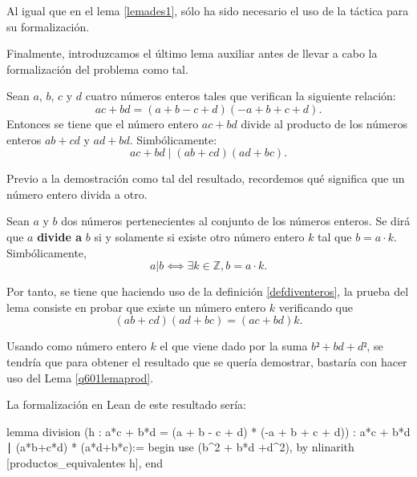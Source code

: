 Al igual que en el lema \ref{lemades1}, sólo ha sido necesario el uso de
la táctica  para su formalización.

Finalmente, introduzcamos el último lema auxiliar antes de llevar a cabo la
formalización del problema como tal.

\begin{lema}[division]\label{lemadivisionq6}
  Sean \(a\), \(b\), \(c\) y \(d\) cuatro números enteros tales que
  verifican la siguiente relación:
    \begin{equation}\tag{h}
      ac+bd = (a+b-c+d)(-a+b+c+d).
    \end{equation}
    Entonces se tiene que el número entero \(ac+bd\) divide al producto de
    los números enteros \(ab+cd\) y \(ad+bd\). Simbólicamente:
    \begin{equation}
      ac+bd ∣ (ab+cd)(ad+bc).
    \end{equation}
\end{lema}

\begin{demostracion}
  Previo a la demostración como tal del resultado, recordemos qué significa que
  un número entero divida a otro.
  \begin{definicion}\label{defdiventeros}
    Sean \(a\) y \(b\) dos números pertenecientes al conjunto de los números
    enteros. Se dirá que  \(a\) \textbf{divide a} \(b\) si y
    solamente si existe otro número entero \(k\) tal que \(b = a · k\).
    Simbólicamente,
    \begin{equation}
    a|b ⟺ ∃ k ∈ ℤ, b = a · k.
    \end{equation}
  \end{definicion}

  Por tanto, se tiene que haciendo uso de la definición \ref{defdiventeros},
  la prueba del lema consiste en probar que existe un número entero \(k\)
  verificando que
  \begin{equation}
    (ab+cd)(ad+bc)=(ac+bd)k.
  \end{equation}
  
  Usando como número entero \(k\) el que viene dado por la suma \(b²+bd+d²\),
  se tendría que para obtener el resultado que se quería demostrar, bastaría
  con hacer uso del Lema \ref{q601lemaprod}.
\end{demostracion}

La formalización en Lean de este resultado sería:
\begin{leancode}
lemma division
  (h : a*c + b*d = (a + b - c + d) * (-a + b + c + d))
  : a*c + b*d ∣ (a*b+c*d) * (a*d+b*c):=
begin
  use (b^2 + b*d +d^2),
  by nlinarith [productos_equivalentes h],
end
\end{leancode}

